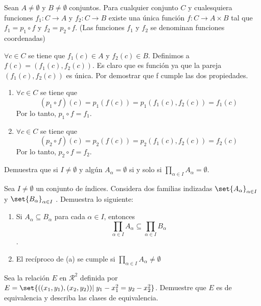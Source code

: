 \documentclass[fc]{tarea}
\begin{document}
\begin{exercise}
   Sean $A \neq \emptyset$ y $B \neq \emptyset$ conjuntos. Para cualquier conjunto $C$ y cualesquiera funciones
   $f_1: C \to A$ y $f_2 : C \to B$ existe una única función $f: C \to A \times B$ tal que $f_1 = p_1 \circ f$
   y $f_2 = p_2 \circ f$. (Las funciones $f_1$ y $f_2$ se denominan funciones coordenadas)
\end{exercise}

\begin{solution}
   $\forall c \in C$ se tiene que $f_1(c) \in A$ y $f_2(c) \in B$. Definimos a $f(c) = (f_1(c), f_2(c))$.
   Es claro que es función ya que la pareja $(f_1(c), f_2(c))$ es única. Por demostrar que f cumple las 
   dos propiedades.
   \begin{enumerate}
      \item $\forall c \in C$ se tiene que $$ (p_1 \circ f)(c) = p_1(f(c)) = p_1(f_1(c), f_2(c)) = f_1(c)$$
            Por lo tanto, $p_1 \circ f = f_1$.
      \item $\forall c \in C$ se tiene que $$ (p_2 \circ f)(c) = p_2(f(c)) = p_2(f_1(c), f_2(c)) = f_2(c)$$
            Por lo tanto, $p_2 \circ f = f_2$. 
   \end{enumerate}
\end{solution}

\begin{exercise}
   Demuestra que si $I\neq \emptyset$ y algún $A_\alpha = \emptyset$ si y solo si $\prod_{\alpha \in I} A_{\alpha} = \emptyset$.
\end{exercise}

\begin{exercise}
   Sea $I \neq \emptyset$ un conjunto de índices. Considera dos familias indizadas $\set{A_{\alpha}}_{\alpha \in I}$ 
   y $\set{B_{\alpha}}_{\alpha \in I}$ . Demuestra lo siguiente:
   \begin{enumerate}
      \item Si $A_{\alpha} \subseteq B_{\alpha}$ para cada $\alpha \in I$, entonces
         $$\prod_{\alpha \in I} A_{\alpha} \subseteq \prod_{\alpha \in I} B_{\alpha}$$.
      \item El recíproco de (a) se cumple si $\prod_{\alpha \in I} A_{\alpha} \neq \emptyset$
   \end{enumerate}
\end{exercise}

\begin{exercise}
   Sea la relación $E$ en $\mathcal{R}^2$ definida por $E = \set{((x_1,y_1),(x_2,y_2)) |\; y_1 - x_1^2 = y_2 - x_2^2 }$. Demuestre que $E$ es de equivalencia y describa las clases de equivalencia.
\end{exercise}
\end{document}
